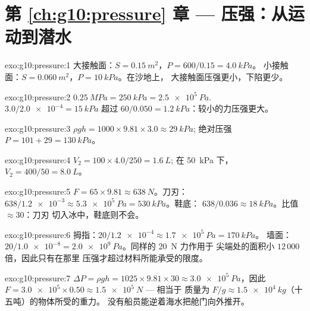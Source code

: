\section*{第 \ref{ch:g10:pressure} 章 --- 压强：从运动到潜水}

\begin{solution}{exo:g10:pressure:1}
大接触面：$S = \qty{0.15}{m^2}$，$P = 600/0.15 = \qty{4.0}{kPa}$。
小接触面：$S = \qty{0.060}{m^2}$，$P = \qty{10}{kPa}$。在沙地上，
大接触面压强更小，下陷更少。
\end{solution}

\begin{solution}{exo:g10:pressure:2}
$\qty{0.25}{MPa} = \qty{250}{kPa} = \qty{2.5e5}{Pa}$.
$3.0/\num{2.0e-4} = \qty{15}{kPa}$ 超过
$60/0.050 = \qty{1.2}{kPa}$：较小的力压强更大。
\end{solution}

\begin{solution}{exo:g10:pressure:3}
$\rho g h = 1000 \times 9.81 \times 3.0 \approx \qty{29}{kPa}$;
绝对压强 $P = 101 + 29 = \qty{130}{kPa}$。
\end{solution}

\begin{solution}{exo:g10:pressure:4}
$V_2 = 100 \times 4.0 / 250 = \qty{1.6}{L}$;
在 \qty{50}{kPa} 下，$V_2 = 400/50 = \qty{8.0}{L}$。
\end{solution}

\begin{solution}{exo:g10:pressure:5}
$F = 65 \times 9.81 \approx \qty{638}{N}$。刀刃：
$638/\num{1.2e-3} \approx \qty{5.3e5}{Pa} = \qty{530}{kPa}$。鞋底：
$638/0.036 \approx \qty{18}{kPa}$。比值 $\approx 30$：刀刃
切入冰中，鞋底则不会。
\end{solution}

\begin{solution}{exo:g10:pressure:6}
拇指：$20/\num{1.2e-4} \approx \qty{1.7e5}{Pa} = \qty{170}{kPa}$。
墙面：$20/\num{1.0e-8} = \qty{2.0e9}{Pa}$。同样的 \qty{20}{N} 力作用于
尖端处的面积小 $12\,000$ 倍，因此只有在那里
压强才超过材料所能承受的限度。
\end{solution}

\begin{solution}{exo:g10:pressure:7}
$\Delta P = \rho g h = 1025 \times 9.81 \times 30 \approx
\qty{3.0e5}{Pa}$，因此
$F = \num{3.0e5} \times 0.50 \approx \qty{1.5e5}{N}$ --- 相当于
质量为 $F/g \approx \qty{1.5e4}{kg}$（十五吨）的物体所受的重力。
没有船员能逆着海水把舱门向外推开。
\end{solution}

